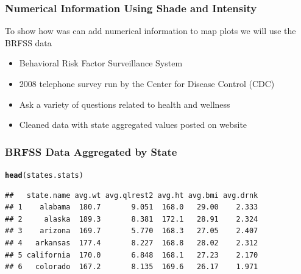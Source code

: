 \documentclass{beamer}\usepackage[]{graphicx}\usepackage[]{color}
\makeatletter
\newcommand{\hlstd}[1]{\textcolor[rgb]{0.345,0.345,0.345}{#1}}%
\newcommand{\hlkwd}[1]{\textcolor[rgb]{0.737,0.353,0.396}{\textbf{#1}}}%
\newenvironment{kframe}{%
 \def\at@end@of@kframe{}%
 \ifinner\ifhmode%
  \def\at@end@of@kframe{\end{minipage}}%
  \begin{minipage}{\columnwidth}%
 \fi\fi%
 \def\FrameCommand##1{\hskip\@totalleftmargin \hskip-\fboxsep
 \colorbox{shadecolor}{##1}\hskip-\fboxsep
     \hskip-\linewidth \hskip-\@totalleftmargin \hskip\columnwidth}%
 \MakeFramed {\advance\hsize-\width
   \@totalleftmargin\z@ \linewidth\hsize
   \@setminipage}}%
 {\par\unskip\endMakeFramed%
 \at@end@of@kframe}
\newenvironment{knitrout}{}{} %
\makeatother
\begin{document}
\begin{frame}
    \frametitle{Numerical Information Using Shade and Intensity}
    
    To show how was can add numerical information to map plots we will use the BRFSS data
    
    \begin{itemize}
        \item Behavioral Risk Factor Surveillance System
        \item 2008 telephone survey run by the Center for Disease Control (CDC)
        \item Ask a variety of questions related to health and wellness
        \item Cleaned data with state aggregated values posted on website
    \end{itemize}    
\end{frame}



\begin{frame}[fragile]
    \frametitle{BRFSS Data Aggregated by State}
    
    
    \small
\begin{knitrout}\footnotesize
{}\color{fgcolor}\begin{kframe}
\begin{alltt}
\hlkwd{head}\hlstd{(states.stats)}
\end{alltt}
\begin{verbatim}
##   state.name avg.wt avg.qlrest2 avg.ht avg.bmi avg.drnk
## 1    alabama  180.7       9.051  168.0   29.00    2.333
## 2     alaska  189.3       8.381  172.1   28.91    2.324
## 3    arizona  169.7       5.770  168.3   27.05    2.407
## 4   arkansas  177.4       8.227  168.8   28.02    2.312
## 5 california  170.0       6.848  168.1   27.23    2.170
## 6   colorado  167.2       8.135  169.6   26.17    1.971
\end{verbatim}
\end{kframe}
\end{knitrout}

    \normalsize
\end{frame}

\end{document}
